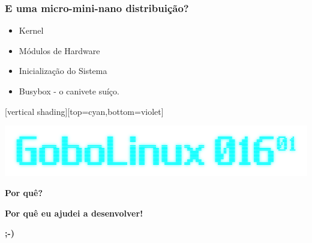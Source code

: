 \documentclass[aspectratio=169,14pt]{beamer}
\begin{document}
\begin{frame}
    \frametitle{E uma micro-mini-nano distribuição?}
    \begin{itemize}
        \item Kernel
        \item Módulos de Hardware
        \item Inicialização do Sistema
        \item Busybox - o canivete suíço.
    \end{itemize}
\end{frame}

{
 [vertical shading][top=cyan,bottom=violet]
\begin{frame}
    \includegraphics[width=0.9\paperwidth]{../images/gobolinux.png}
\end{frame}
}

\begin{frame}
    \begin{center}
    \huge \textbf{Por quê?}
    \end{center}
\end{frame}

\begin{frame}
    \begin{center}
    \huge \textbf{Por quê eu ajudei a desenvolver!}

    \huge \textbf{;-)}
    \end{center}
\end{frame}
\end{document}
